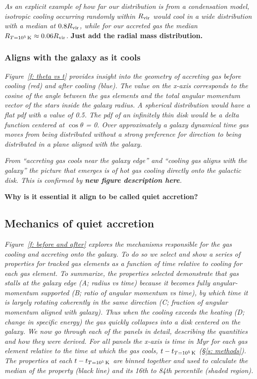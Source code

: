 \documentclass[fleqn,usenatbib]{mnras}
\newcommand{\Rcon}{R_{T=10^5\,{\rm K}}}
\newcommand{\tcon}{t_{T=10^5\,{\rm K}}}
\begin{document}
\textit{
As an explicit example of how far our distribution is from a condensation model, isotropic cooling occurring randomly within $R_{\rm vir}$ would cool in a wide distribution with a median at $0.8 R_{\rm vir}$, while for our accreted gas the median $\Rcon \approx 0.06 R_{\rm vir}$.
}
\textbf{Just add the radial mass distribution.}

\subsubsection{Aligns with the galaxy as it cools}
\label{s: aligns}

\textit{
Figure~\ref{f: theta vs t} provides insight into the geometry of accreting gas before cooling (red) and after cooling (blue).
The value on the x-axis corresponds to the cosine of the angle between the gas elements and the total angular momentum vector of the stars inside the galaxy radius.
A spherical distribution would have a flat pdf with a value of 0.5.
The pdf of an infinitely thin disk would be a delta function centered at $\cos\theta$ = 0.
Over approximately a galaxy dynamical time gas moves from being distributed without a strong preference for direction to being distributed in a plane aligned with the galaxy.
}

\textit{
From ``accreting gas cools near the galaxy edge'' and ``cooling gas aligns with the galaxy'' the picture that emerges is of hot gas cooling directly onto the galactic disk.
This is confirmed by \textbf{new figure description here}.
}

\textbf{Why is it essential it align to be called quiet accretion?}

\subsection{Mechanics of quiet accretion}
\label{s: mechanics}

\textit{
Figure~\ref{f: before and after} explores the mechanisms responsible for the gas cooling and accreting onto the galaxy.
To do so we select and show a series of properties for tracked gas elements as a function of time relative to cooling for each gas element.
To summarize, the properties selected demonstrate that gas stalls at the galaxy edge (A; radius vs time) because it becomes fully angular-momentum supported (B; ratio of angular momentum vs time), by which time it is largely rotating coherently in the same direction (C; fraction of angular momentum aligned with galaxy).
Thus when the cooling exceeds the heating (D; change in specific energy) the gas quickly collapses into a disk centered on the galaxy.
We now go through each of the panels in detail, describing the quantities and how they were derived.
For all panels the x-axis is time in Myr for each gas element relative to the time at which the gas cools, $t - \tcon$ (\S\ref{s: methods}).
The properties at each $t - \tcon$ are binned together and used to calculate the median of the property (black line) and its 16th to 84th percentile (shaded region).
}
\end{document}
